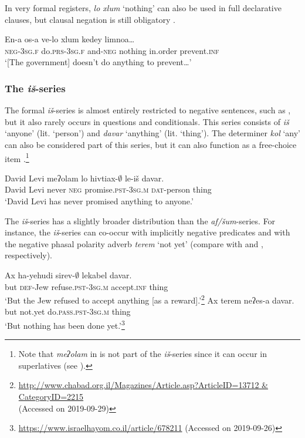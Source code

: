 \documentclass[output=paper,colorlinks,citecolor=brown]{langscibook}
\begin{document}
In very formal registers, \textit{lo xlum} ‘nothing’ can also be used in full declarative clauses, but clausal negation is still obligatory .

\ea\label{ex:heb:24}
    \gll En-a os-a ve-lo xlum kedey limnoa…\\ 
        \textsc{neg}{}-3\textsc{sg.f} do.\textsc{prs-3sg.f} and-\textsc{neg} nothing  in.order prevent.\textsc{inf}\\
    \glt ‘[The government] doesn’t do anything to prevent…’ \citep[144]{Tzivoni1993} 
\z 

\subsubsection{The \textit{iš}{}-series} \label{sec:heb:3.2.2}


The formal \textit{iš}{}-series is almost entirely restricted to negative sentences, such as , but it also rarely occurs in questions and conditionals. This series consists of \textit{iš} ‘anyone’ (lit. ‘person') and \textit{davar} ‘anything' (lit. ‘thing'). The determiner \textit{kol} ‘any’ can also be considered part of this series, but it can also function as a free-choice item \citep[298]{Haspelmath1997}.\footnote{Note that \textit{meʔolam} in  is not part of the \textit{iš}{}-series since it can occur in superlatives (see ).}

\ea\label{ex:heb:25} 
    \gll David Levi meʔolam lo hivtiax-${\emptyset}$ le-iš davar. \\
         David Levi never \textsc{neg} promise.\textsc{pst-3sg.m} \textsc{dat}{}-person thing \\
    \glt ‘David Levi has never promised anything to anyone.’ \citep[111]{Tzivoni1993}
\z 

The \textit{iš}{}-series has a slightly broader distribution than the \textit{af/šum}{}-series. For instance, the \textit{iš}{}-series can co-occur with implicitly negative predicates  and with the negative phasal polarity adverb \textit{terem} ‘not yet’  (compare with  and , respectively).

\ea\label{ex:heb:26}
    \ea\label{ex:heb:26a}
        \gll Ax ha-yehudi sirev{}-${\emptyset}$ lekabel davar. \\
             but \textsc{def}{}-Jew refuse.\textsc{pst-3sg.m}  accept.\textsc{inf} thing \\
        \glt ‘But the Jew refused to accept anything [as a reward].’\footnote{\url{http://www.chabad.org.il/Magazines/Article.asp?ArticleID=13712 & CategoryID=2215}\\ (Accessed on 2019-09-29)}
    \ex\label{ex:heb:26b}
        \gll Ax terem neʔes-a davar.\\
            but not.yet do\textsc{.pass.pst-3sg.m} thing\\
        \glt ‘But nothing has been done yet.’\footnote{\url{https://www.israelhayom.co.il/article/678211} (Accessed on 2019-09-26)}
    \z
\z 
\end{document}

